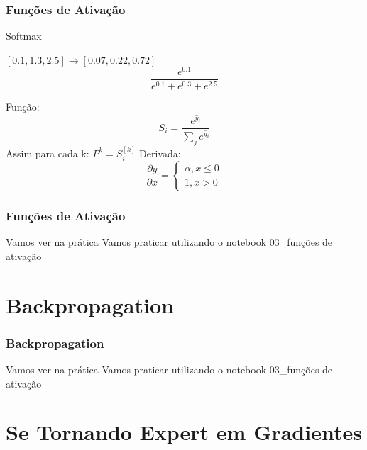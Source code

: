 \documentclass{beamer}
\begin{document}
\begin{frame}
	\frametitle{Funções de Ativação}
	\begin{block}{Softmax}
		\begin{example}
			$[0.1, 1.3, 2.5] \to [0.07, 0.22, 0.72] $ \\
			$$\frac{e^{0.1}}{e^{0.1} + e^{0.3} + e^{2.5}}$$
		\end{example}
		Função:
		$$S_i = \frac{e^{\hat{y}_i}}{\sum_j e^{\hat{y}_i}} $$
		Assim para cada k: $P^k = S_i^{[k]}$
		Derivada: 	$$\frac{\partial y}{\partial x} =
		\left\{\begin{matrix}
			\alpha, x \leq 0
			\\ 
			1, x > 0
		\end{matrix}\right.$$
	\end{block}
\end{frame}
\begin{frame}
	\frametitle{Funções de Ativação}
	\begin{block}{Vamos ver na prática}
		Vamos praticar utilizando o notebook 03\_funções de ativação
	\end{block}
\end{frame}

\section{Backpropagation}
\begin{frame}
	\frametitle{Backpropagation}
	\begin{block}{Vamos ver na prática}
		Vamos praticar utilizando o notebook 03\_funções de ativação
	\end{block}
\end{frame}

\section{Se Tornando Expert em Gradientes}
\end{document}
